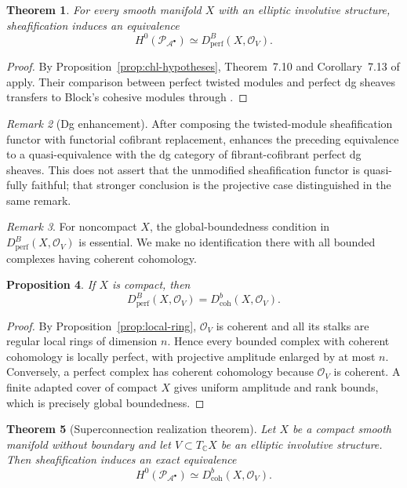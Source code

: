 \documentclass[12pt]{amsart}
\newtheorem{thm}{Theorem}[section]
\newtheorem{prop}[thm]{Proposition}
\theoremstyle{definition}
\theoremstyle{remark}
\newtheorem{rem}[thm]{Remark}
\numberwithin{equation}{section}
\newcommand{\CA}{\mathcal A}
\newcommand{\CO}{\mathcal O}
\newcommand{\C}{\mathbb C}
\begin{document}
\begin{thm}\label{thm:noncompact}
For every smooth manifold \(X\) with an elliptic involutive structure,
sheafification induces an equivalence
\[
H^0\!\left(\mathcal P_{\CA^\bullet}\right)
\simeq
D_{\mathrm{perf}}^B(X,\CO_V).
\]
\end{thm}

\begin{proof}
By Proposition~\ref{prop:chl-hypotheses}, Theorem~7.10 and
Corollary~7.13 of \cite{CHL2021} apply.  Their comparison between perfect
twisted modules and perfect dg sheaves transfers to Block's cohesive modules
through \cite[Corollary~3.4]{CHL2021}.
\end{proof}

\begin{rem}[Dg enhancement]
\label{rem:dg-enhancement}
After composing the twisted-module sheafification functor with functorial
cofibrant replacement, \cite[Remark~7.5]{CHL2021} enhances the preceding
equivalence to a quasi-equivalence with the dg category of fibrant-cofibrant
perfect dg sheaves.  This does not assert that the unmodified
sheafification functor is quasi-fully faithful; that stronger conclusion is
the projective case distinguished in the same remark.
\end{rem}

\begin{rem}
For noncompact \(X\), the global-boundedness condition in
\(D_{\mathrm{perf}}^B(X,\CO_V)\) is essential.  We make no identification
there with all bounded complexes having coherent cohomology.
\end{rem}

\begin{prop}\label{prop:perf-coh}
If \(X\) is compact, then
\[
D_{\mathrm{perf}}^B(X,\CO_V)
=D^b_{\mathrm{coh}}(X,\CO_V).
\]
\end{prop}

\begin{proof}
By Proposition~\ref{prop:local-ring}, \(\CO_V\) is coherent and all its
stalks are regular local rings of dimension \(n\).  Hence every bounded
complex with coherent cohomology is locally perfect, with projective
amplitude enlarged by at most \(n\).  Conversely, a perfect complex has
coherent cohomology because \(\CO_V\) is coherent.  A finite adapted cover of
compact \(X\) gives uniform amplitude and rank bounds, which is precisely
global boundedness.
\end{proof}

\begin{thm}[Superconnection realization theorem]\label{thm:main}
Let \(X\) be a compact smooth manifold without boundary and let
\(V\subset T_{\C}X\) be an elliptic involutive structure.  Then
sheafification induces an exact equivalence
\[
\boxed{
H^0\!\left(\mathcal P_{\CA^\bullet}\right)
\simeq
D^b_{\mathrm{coh}}(X,\CO_V).
}
\]
\end{thm}
\end{document}

